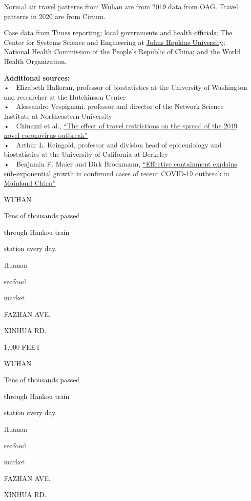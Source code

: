 Normal air travel patterns from Wuhan are from 2019 data from OAG.
Travel patterns in 2020 are from Cirium.

Case data from Times reporting; local governments and health officials;
The Center for Systems Science and Engineering at
\href{https://gisanddata.maps.arcgis.com/apps/opsdashboard/index.html\#/bda7594740fd40299423467b48e9ecf6}{Johns
Hopkins University}; National Health Commission of the People's Republic
of China; and the World Health Organization.

\textbf{Additional sources:}\\
•~~Elizabeth Halloran, professor of biostatistics at the University of
Washington and researcher at the Hutchinson Center\\
•~~Alessandro Vespignani, professor and director of the Network Science
Institute at Northeastern University\\
•~~Chinazzi et al.,
\href{https://science.sciencemag.org/content/early/2020/03/05/science.aba9757.full}{``The
effect of travel restrictions on the spread of the 2019 novel
coronavirus outbreak''}\\
•~~Arthur L. Reingold, professor and division head of epidemiology and
biostatistics at the University of California at Berkeley\\
•~~Benjamin F. Maier and Dirk Brockmann,
\href{https://www.medrxiv.org/content/10.1101/2020.02.18.20024414v1}{``Effective
containment explains sub-exponential growth in confirmed cases of recent
COVID-19 outbreak in Mainland China''}

WUHAN

Tens of thousands passed

through Hankou train

station every day.

Huanan

seafood

market

FAZHAN AVE.

XINHUA RD.

1,000 FEET

WUHAN

Tens of thousands passed

through Hankou train

station every day.

Huanan

seafood

market

FAZHAN AVE.

XINHUA RD.

